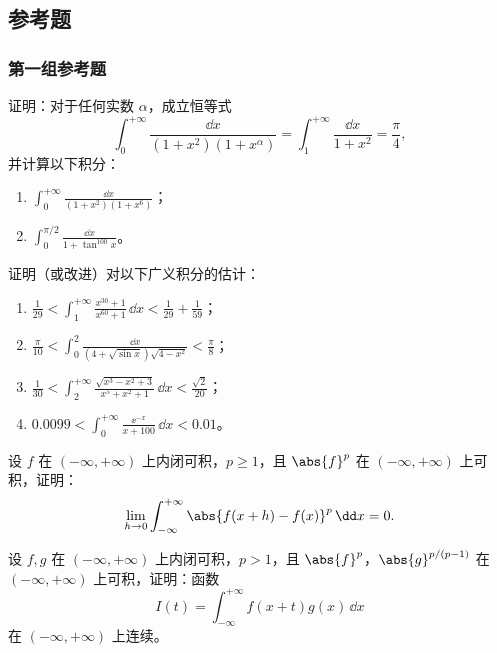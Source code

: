 \subsection{参考题}

\subsubsection*{第一组参考题}

\begin{xreferenceproblem}[1]
证明：对于任何实数 $\alpha$，成立恒等式
  \[
    \int_0^{+\infty}\frac{\dd x}{(1+x^2)(1+x^\alpha)}
    =\int_1^{+\infty}\frac{\dd x}{1+x^2}
    =\frac\pi4,
  \]
  并计算以下积分：
  \begin{enumerate}[label=(\arabic*)]
    \item $\displaystyle\int_0^{+\infty}\frac{\dd x}{(1+x^2)(1+x^6)}$；
    \item $\displaystyle\int_0^{\pi/2}\frac{\dd x}{1+\tan^{100}x}$。
  \end{enumerate}
\end{xreferenceproblem}

\begin{xreferenceproblem}[2]
证明（或改进）对以下广义积分的估计：
  \begin{enumerate}[label=(\arabic*)]
    \item $\displaystyle\frac1{29}<\int_1^{+\infty}\frac{x^{30}+1}{x^{60}+1}\,\dd x<\frac1{29}+\frac1{59}$；
    \item $\displaystyle\frac\pi{10}<\int_0^2\frac{\dd x}{(4+\sqrt{\sin x})\sqrt{4-x^2}}<\frac\pi8$；
    \item $\displaystyle\frac1{30}<\int_2^{+\infty}\frac{\sqrt{x^3-x^2+3}}{x^5+x^2+1}\,\dd x<\frac{\sqrt2}{20}$；
    \item $\displaystyle0.0099<\int_0^{+\infty}\frac{\ee^{-x}}{x+100}\,\dd x<0.01$。
  \end{enumerate}
\end{xreferenceproblem}

\begin{xreferenceproblem}[3]
设 $f$ 在 $(-\infty,+\infty)$ 上内闭可积，$p\geq1$，且 $\abs{f}^p$ 在 $(-\infty,+\infty)$ 上可积，证明：
  \[
    \lim_{h\to0}\int_{-\infty}^{+\infty}\abs{f(x+h)-f(x)}^p\,\dd x=0.
  \]
\end{xreferenceproblem}

\begin{xreferenceproblem}[4]
设 $f,g$ 在 $(-\infty,+\infty)$ 上内闭可积，$p>1$，且 $\abs{f}^p$，$\abs{g}^{p/(p-1)}$ 在 $(-\infty,+\infty)$ 上可积，证明：函数
  \[
    I(t)=\int_{-\infty}^{+\infty}f(x+t)g(x)\,\dd x
  \]
  在 $(-\infty,+\infty)$ 上连续。
\end{xreferenceproblem}

